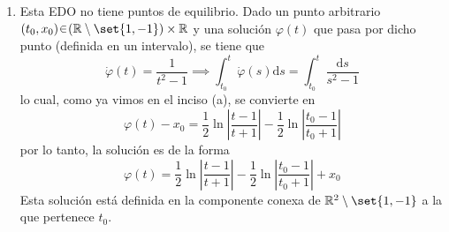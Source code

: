 \begin{sol}
\begin{enumerate}[label = (\alph*)]
\begin{align*}
        &= \frac12 \big(%
            \ln|\varphi(t) - 1| - \ln|x_0 - 1| - \ln|\varphi(t) + 1| + \ln|x_0 + 1|
        \big)\\
        &= \frac12\ln\left|%
            \frac{(\varphi(t) - 1)(x_0 + 1)}{(\varphi(t) + 1)(x_0 - 1)}
        \right|
    \end{align*}
    Despejando $\varphi(t)$ concluimos que la solución es
    \[
        \varphi(t) = \frac{%
            1 + \big(\frac{x_0-1}{x_0+1}\big) e^{2(t-t_0)}
        }{%
            1 - \big(\frac{x_0-1}{x_0+1}\big) e^{2(t-t_0)}
        }
    \]
    Más aún, cuando $|x_0| < 1$ el denominador jamás se anula, por lo que $\varphi(t)$ está definida en todo $\mathbb{R}$. Por otro lado, cuando $|x_0| > 1$ el denominador se anulará en $T = t_0 + \frac12 \ln\big(\frac{x_0 + 1}{x_0 - 1}\big)$ y, en el caso $x_0 > 1$, $\varphi(t)$ estará definida en $]{-\infty}, T[$; mientras que en el caso $x_0 < -1$, $\varphi(t)$ estará definida en $]T, +\infty[$.

    \item Esta EDO no tiene puntos de equilibrio. Dado un punto arbitrario $(t_0, x_0) \en (\mathbb{R}\setminus\set{1,-1}) \times \mathbb{R}$ y una solución $\varphi(t)$ que pasa por dicho punto (definida en un intervalo), se tiene que
    \[
        \dot\varphi(t) = \frac{1}{t^2-1}%
        \implies%
        \int^{t}_{t_0} \dot\varphi(s) \mathrm{d}s = \int^{t}_{t_0} \frac{\mathrm{d}s}{s^2 - 1}
    \]
    lo cual, como ya vimos en el inciso (a), se convierte en 
    \[
        \varphi(t) - x_0%
        = \frac12\ln\left|%
            \frac{t - 1}{t + 1}
        \right| - \frac12\ln\left|%
            \frac{t_0 - 1}{t_0 + 1}
        \right|
    \]
    por lo tanto, la solución es de la forma 
    \[
        \varphi(t)%
        = \frac12\ln\left|%
            \frac{t - 1}{t + 1}
        \right| - \frac12\ln\left|%
            \frac{t_0 - 1}{t_0 + 1}
        \right| + x_0
    \]
    Esta solución está definida en la componente conexa de $\mathbb{R}^2\setminus\set{1,-1}$ a la que pertenece $t_0$.


\end{enumerate}
\end{sol}
